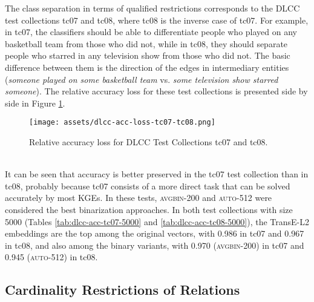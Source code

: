 \documentclass[11pt,titlepage,oneside,openany]{book}
\begin{document}
The class separation in terms of qualified restrictions corresponds to the DLCC test collections tc07 and tc08, where tc08 is the inverse case of tc07. For example, in tc07, the classifiers should be able to differentiate people who played on any basketball team from those who did not, while in tc08, they should separate people who starred in any television show from those who did not. The basic difference between them is the direction of the edges in intermediary entities (\textit{someone played on some basketball team} vs. \textit{some television show starred someone}). The relative accuracy loss for these test collections is presented side by side in Figure \ref{fig:dlcc-acc-loss-tc07-tc08}.\\
\begin{figure}[h!]
    \centering
    \centerline{\texttt{[image: assets/dlcc-acc-loss-tc07-tc08.png]}}
    \vspace*{-3mm}
    \caption{Relative accuracy loss for DLCC Test Collections tc07 and tc08.}
    \label{fig:dlcc-acc-loss-tc07-tc08}
\end{figure}
\\
It can be seen that accuracy is better preserved in the tc07 test collection than in tc08, probably because tc07 consists of a more direct task that can be solved accurately by most KGEs. In these tests, \textsc{avgbin-200} and \textsc{auto-512} were considered the best binarization approaches. In both test collections with size 5000 (Tables \ref{tab:dlcc-acc-tc07-5000} and \ref{tab:dlcc-acc-tc08-5000}), the TransE-L2 embeddings are the top among the original vectors, with 0.986 in tc07 and 0.967 in tc08, and also among the binary variants, with 0.970 (\textsc{avgbin-200}) in tc07 and 0.945 (\textsc{auto-512}) in tc08.


\subsection{Cardinality Restrictions of Relations}
\label{subsubsec:tc09-tc10}
\end{document}
